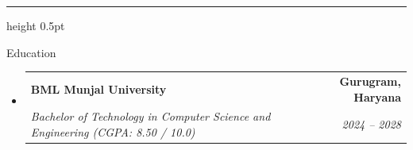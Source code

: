 \documentclass[letterpaper,10pt]{article}
\makeatletter
\renewcommand{\section}{\@ifstar\@sectionStar\@sectionNoStar}
\newcommand{\@sectionStar}[1]{%
  \par\vspace{4.5pt}%
  {\large\bfseries\scshape #1}%
  \par\vspace{2.5pt}%
  \hrule height 0.5pt%
  \par\vspace{3.5pt}%
}
\newcommand{\@sectionNoStar}[1]{%
  \par\vspace{4.5pt}%
  {\large\bfseries\scshape #1}%
  \par\vspace{2.5pt}%
  \hrule height 0.5pt%
  \par\vspace{3.5pt}%
}
\newcommand{\resumeSubheading}[4]{
  \item
    \begin{tabular*}{\textwidth}[t]{l@{\extracolsep{\fill}}r}
      \textbf{#1} & \textbf{\small #2} \\
      \textit{\small#3} & \textit{\small #4} \\
    \end{tabular*}\vspace{-2pt}
}
\newcommand{\resumeSubHeadingListStart}{\begin{itemize}[leftmargin=0.0in, label={}, topsep=1pt, itemsep=2.5pt]}
\newcommand{\resumeSubHeadingListEnd}{\end{itemize}\vspace{-2pt}}
\makeatother
\begin{document}
\section{Education}
  \resumeSubHeadingListStart
    \resumeSubheading
      {BML Munjal University}{Gurugram, Haryana}
      {Bachelor of Technology in Computer Science and Engineering (CGPA: 8.50 / 10.0)}{2024 -- 2028}
  \resumeSubHeadingListEnd

\end{document}
